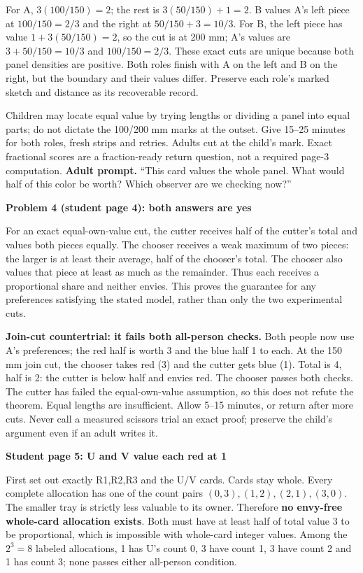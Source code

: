 \documentclass[11pt]{article}
\newcommand{\heading}[1]{\par\vspace{1.5mm}{\large\bfseries #1}\par\vspace{.8mm}}
\newcommand{\subhead}[1]{\par\vspace{1mm}\textbf{#1}\par}
\newcommand{\adult}[1]{\textbf{Adult prompt.} #1\par}
\newcommand{\page}[1]{\newpage\heading{#1}}
\begin{document}
For A, $3(100/150)=2$; the rest is $3(50/150)+1=2$. B values A's left piece at $100/150=2/3$ and the right at $50/150+3=10/3$. For B, the left piece has value $1+3(50/150)=2$, so the cut is at 200 mm; A's values are $3+50/150=10/3$ and $100/150=2/3$. These exact cuts are unique because both panel densities are positive. Both roles finish with A on the left and B on the right, but the boundary and their values differ. Preserve each role's marked sketch and distance as its recoverable record.

Children may locate equal value by trying lengths or dividing a panel into equal parts; do not dictate the 100/200 mm marks at the outset. Give 15--25 minutes for both roles, fresh strips and retries. Adults cut at the child's mark. Exact fractional scores are a fraction-ready return question, not a required page-3 computation. \adult{``This card values the whole panel. What would half of this color be worth? Which observer are we checking now?''}

\subhead{Problem 4 (student page 4): both answers are yes}
For an exact equal-own-value cut, the cutter receives half of the cutter's total and values both pieces equally. The chooser receives a weak maximum of two pieces: the larger is at least their average, half of the chooser's total. The chooser also values that piece at least as much as the remainder. Thus each receives a proportional share and neither envies. This proves the guarantee for any preferences satisfying the stated model, rather than only the two experimental cuts.

\textbf{Join-cut countertrial: it fails both all-person checks.} Both people now use A's preferences; the red half is worth 3 and the blue half 1 to each. At the 150 mm join cut, the chooser takes red (3) and the cutter gets blue (1). Total is 4, half is 2: the cutter is below half and envies red. The chooser passes both checks. The cutter has failed the equal-own-value assumption, so this does not refute the theorem. Equal lengths are insufficient. Allow 5--15 minutes, or return after more cuts. Never call a measured scissors trial an exact proof; preserve the child's argument even if an adult writes it.

\page{Problem 5: an obstruction removed by a split}
\subhead{Student page 5: U and V value each red at 1}
First set out exactly R1,R2,R3 and the U/V cards. Cards stay whole. Every complete allocation has one of the count pairs $(0,3),(1,2),(2,1),(3,0)$. The smaller tray is strictly less valuable to its owner. Therefore \textbf{no envy-free whole-card allocation exists}. Both must have at least half of total value 3 to be proportional, which is impossible with whole-card integer values. Among the $2^3=8$ labeled allocations, 1 has U's count 0, 3 have count 1, 3 have count 2 and 1 has count 3; none passes either all-person condition.
\end{document}
